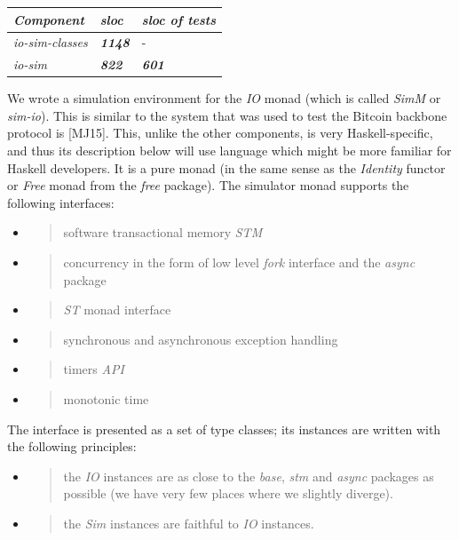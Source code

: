 \documentclass[]{article}
\begin{document}
\begin{longtable}[]{@{}lll@{}}
\toprule
\emph{Component} & \emph{sloc} & \emph{sloc of tests}\tabularnewline
\midrule
\endhead
\emph{io-sim-classes} & \emph{\textbf{1148}} & -\tabularnewline
\emph{io-sim} & \emph{\textbf{822}} & \emph{\textbf{601}}\tabularnewline
\bottomrule
\end{longtable}

We wrote a simulation environment for the \emph{IO} monad (which is
called \emph{SimM} or \emph{sim-io}). This is similar to the system that
was used to test the Bitcoin backbone protocol is {[}MJ15{]}. This,
unlike the other components, is very Haskell-specific, and thus its
description below will use language which might be more familiar for
Haskell developers. It is a pure monad (in the same sense as the
\emph{Identity} functor or \emph{Free} monad from the \emph{free}
package). The simulator monad supports the following interfaces:

\begin{itemize}
\item
  \begin{quote}
  software transactional memory \emph{STM}
  \end{quote}
\item
  \begin{quote}
  concurrency in the form of low level \emph{fork} interface and the
  \emph{async} package
  \end{quote}
\item
  \begin{quote}
  \emph{ST} monad interface
  \end{quote}
\item
  \begin{quote}
  synchronous and asynchronous exception handling
  \end{quote}
\item
  \begin{quote}
  timers \emph{API}
  \end{quote}
\item
  \begin{quote}
  monotonic time
  \end{quote}
\end{itemize}

The interface is presented as a set of type classes; its instances are
written with the following principles:

\begin{itemize}
\item
  \begin{quote}
  the \emph{IO} instances are as close to the \emph{base}, \emph{stm}
  and \emph{async} packages as possible (we have very few places where
  we slightly diverge).
  \end{quote}
\item
  \begin{quote}
  the \emph{Sim} instances are faithful to \emph{IO} instances.
  \end{quote}
\end{itemize}
\end{document}
